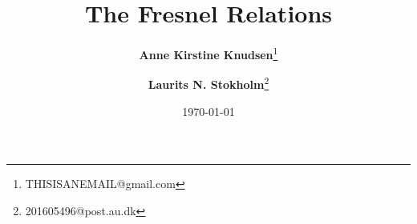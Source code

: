 \documentclass[danish, a4paper, 11pt, onecolumn, oneside]{memoir}
\title{The Fresnel Relations}
\author{%
    \textbf{Anne Kirstine Knudsen}\thanks{THISISANEMAIL@gmail.com}
    \and \textbf{Laurits N. Stokholm}\thanks{201605496@post.au.dk}
}
\date{\today}
\begin{document}
\begin{titlingpage}
\maketitle
\end{titlingpage}

%
%
%
%
%
%
\end{document}
